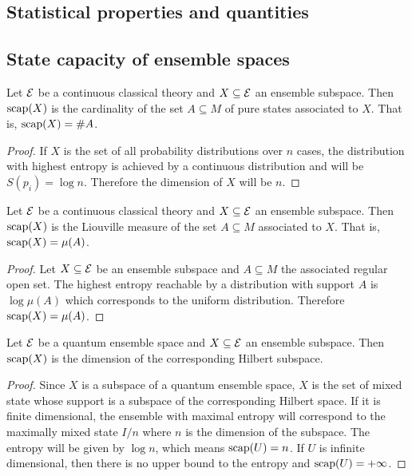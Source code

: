\subsection{Statistical properties and quantities}



\subsection{State capacity of ensemble spaces}


\begin{prop}
	Let $\mathcal{E}$ be a continuous classical theory and $X \subseteq \mathcal{E}$ an ensemble subspace. Then $\mathrm{scap}(X)$ is the cardinality of the set $A \subseteq M$ of pure states associated to $X$. That is, $\mathrm{scap}(X) = \#A$.
\end{prop}

\begin{proof}
	If $X$ is the set of all probability distributions over $n$ cases, the distribution with highest entropy is achieved by a continuous distribution and will be $S(p_i) = \log n$. Therefore the dimension of $X$ will be $n$.
\end{proof}

\begin{prop}
	Let $\mathcal{E}$ be a continuous classical theory and $X \subseteq \mathcal{E}$ an ensemble subspace. Then $\mathrm{scap}(X)$ is the Liouville measure of the set $A \subseteq M$ associated to $X$. That is, $\mathrm{scap}(X) = \mu(A)$.
\end{prop}

\begin{proof}
	Let $X \subseteq \mathcal{E}$ be an ensemble subspace and $A \subseteq M$ the associated regular open set. The highest entropy reachable by a distribution with support $A$ is $\log \mu(A)$ which corresponds to the uniform distribution. Therefore $\mathrm{scap}(X) = \mu(A)$.
\end{proof}

\begin{prop}
	Let $\mathcal{E}$ be a quantum ensemble space and $X \subseteq \mathcal{E}$ an ensemble subspace. Then $\mathrm{scap}(X)$ is the dimension of the corresponding Hilbert subspace.
\end{prop}

\begin{proof}
	Since $X$ is a subspace of a quantum ensemble space, $X$ is the set of mixed state whose support is a subspace of the corresponding Hilbert space. If it is finite dimensional, the ensemble with maximal entropy will correspond to the maximally mixed state $I/n$ where $n$ is the dimension of the subspace. The entropy will be given by $\log n$, which means $\mathrm{scap}(U) = n$. If $U$ is infinite dimensional, then there is no upper bound to the entropy and $\mathrm{scap}(U) = + \infty$.
\end{proof}

